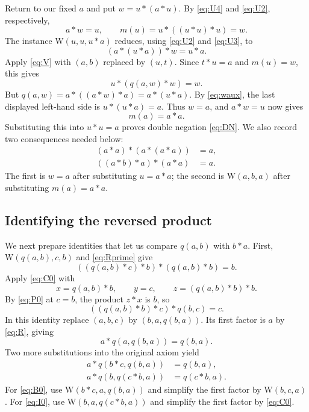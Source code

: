 \documentclass[11pt,a4paper]{article}
\newcommand{\W}{\mathrm{W}}
\begin{document}
Return to our fixed $a$ and put $w=u*(a*u)$. By \eqref{eq:U4}
and \eqref{eq:U2}, respectively,
\begin{equation}
 a*w=u,\qquad m(u)=u*((u*u)*u)=w.\label{eq:w}
\end{equation}
The instance $\W(u,u,u*a)$ reduces, using \eqref{eq:U2} and
\eqref{eq:U3}, to
\begin{equation}
 (a*(u*a))*w=u*a.\label{eq:waux}
\end{equation}
Apply \eqref{eq:V} with $(a,b)$ replaced by $(u,t)$. Since $t*u=a$
and $m(u)=w$, this gives
\[
 u*(q(a,w)*w)=w.
\]
But $q(a,w)=a*((a*w)*a)=a*(u*a)$. By \eqref{eq:waux}, the last
displayed left-hand side is $u*(u*a)=a$. Thus $w=a$, and $a*w=u$
now gives
\begin{equation}
 \boxed{m(a)=a*a.}\label{eq:m}
\end{equation}
Substituting this into $u*u=a$ proves double negation \eqref{eq:DN}.
We also record two consequences needed below:
\begin{align}
 (a*a)*(a*(a*a))&=a,\tag{H}\label{eq:H}\\
 ((a*b)*a)*(a*a)&=a.\tag{L}\label{eq:L}
\end{align}
The first is $w=a$ after substituting $u=a*a$; the second is
$\W(a,b,a)$ after substituting $m(a)=a*a$.

\subsection{Identifying the reversed product}
We next prepare identities that let us compare $q(a,b)$ with $b*a$.
First, $\W(q(a,b),c,b)$ and \eqref{eq:Rprime} give
\begin{equation}
 ((q(a,b)*c)*b)*(q(a,b)*b)=b.\tag{$P_0$}\label{eq:P0}
\end{equation}
Apply \eqref{eq:C0} with
\[
 x=q(a,b)*b,\qquad y=c,\qquad z=(q(a,b)*b)*b.
\]
By \eqref{eq:P0} at $c=b$, the product $z*x$ is $b$, so
\begin{equation}
 ((q(a,b)*b)*c)*q(b,c)=c.\tag{$E_0$}\label{eq:E0}
\end{equation}
In this identity replace $(a,b,c)$ by $(b,a,q(b,a))$.
Its first factor is $a$ by \eqref{eq:R}, giving
\begin{equation}
 a*q(a,q(b,a))=q(b,a).\tag{$K_0$}\label{eq:K0}
\end{equation}
Two more substitutions into the original axiom yield
\begin{align}
 a*q(b*c,q(b,a))&=q(b,a),\tag{$B_0$}\label{eq:B0}\\
 a*q(b,q(c*b,a))&=q(c*b,a).\tag{$I_0$}\label{eq:I0}
\end{align}
For \eqref{eq:B0}, use $\W(b*c,a,q(b,a))$ and simplify the first
factor by $\W(b,c,a)$. For \eqref{eq:I0}, use
$\W(b,a,q(c*b,a))$ and simplify the first factor by \eqref{eq:C0}.
\end{document}
